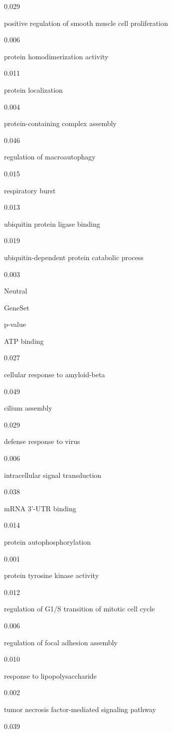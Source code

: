 \documentclass[
  letterpaper,
  DIV=11,
  numbers=noendperiod,
  openany,
  oneside]{scrreprt}
\begin{document}
0.029

positive regulation of smooth muscle cell proliferation

0.006

protein homodimerization activity

0.011

protein localization

0.004

protein-containing complex assembly

0.046

regulation of macroautophagy

0.015

respiratory burst

0.013

ubiquitin protein ligase binding

0.019

ubiquitin-dependent protein catabolic process

0.003

Neutral

GeneSet

p-value

ATP binding

0.027

cellular response to amyloid-beta

0.049

cilium assembly

0.029

defense response to virus

0.006

intracellular signal transduction

0.038

mRNA 3'-UTR binding

0.014

protein autophosphorylation

0.001

protein tyrosine kinase activity

0.012

regulation of G1/S transition of mitotic cell cycle

0.006

regulation of focal adhesion assembly

0.010

response to lipopolysaccharide

0.002

tumor necrosis factor-mediated signaling pathway

0.039
\end{document}

